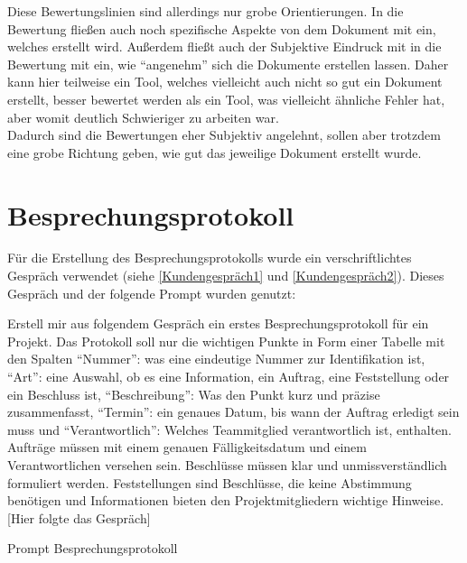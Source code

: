 Diese Bewertungslinien sind allerdings nur grobe Orientierungen. In die Bewertung fließen auch noch spezifische 
Aspekte von dem Dokument mit ein, welches erstellt wird. Außerdem fließt auch der Subjektive Eindruck mit in die 
Bewertung mit ein, wie ``angenehm'' sich die Dokumente erstellen lassen. Daher kann hier teilweise ein Tool, welches 
vielleicht auch nicht so gut ein Dokument erstellt, besser bewertet werden als ein Tool, was vielleicht ähnliche 
Fehler hat, aber womit deutlich Schwieriger zu arbeiten war.\\
Dadurch sind die Bewertungen eher Subjektiv angelehnt, sollen aber trotzdem eine grobe Richtung geben, wie gut das 
jeweilige Dokument erstellt wurde.


\section{Besprechungsprotokoll}  \label{CompBesprechungsprotokoll}

Für die Erstellung des Besprechungsprotokolls wurde ein verschriftlichtes Gespräch verwendet 
(siehe \autoref{Kundengespräch1} und \autoref{Kundengespräch2}). Dieses Gespräch und der folgende Prompt wurden 
genutzt:

\begin{prompt}[H]
    \begin{tcolorbox}[colback=gray!20, colframe=gray!20, boxrule=0pt, sharp corners] 
        Erstell mir aus folgendem Gespräch ein erstes Besprechungsprotokoll für ein Projekt. Das Protokoll soll nur 
        die wichtigen Punkte in Form einer Tabelle mit den Spalten ``Nummer'': was eine eindeutige Nummer zur 
        Identifikation ist, ``Art'': eine Auswahl, ob es eine Information, ein Auftrag, eine Feststellung oder ein 
        Beschluss ist, ``Beschreibung'': Was den Punkt kurz und präzise zusammenfasst, ``Termin'': ein genaues Datum, bis 
        wann der Auftrag erledigt sein muss und ``Verantwortlich'': Welches Teammitglied verantwortlich ist, enthalten. 
        Aufträge müssen mit einem genauen Fälligkeitsdatum und einem Verantwortlichen versehen sein. Beschlüsse 
        müssen klar und unmissverständlich formuliert werden. Feststellungen sind Beschlüsse, die keine Abstimmung 
        benötigen und Informationen bieten den Projektmitgliedern wichtige Hinweise. 
        [Hier folgte das Gespräch]
        \vfill
    \end{tcolorbox}
    \caption{Prompt Besprechungsprotokoll}
    \label{Prompt Besprechungsprotokoll}
\end{prompt}

